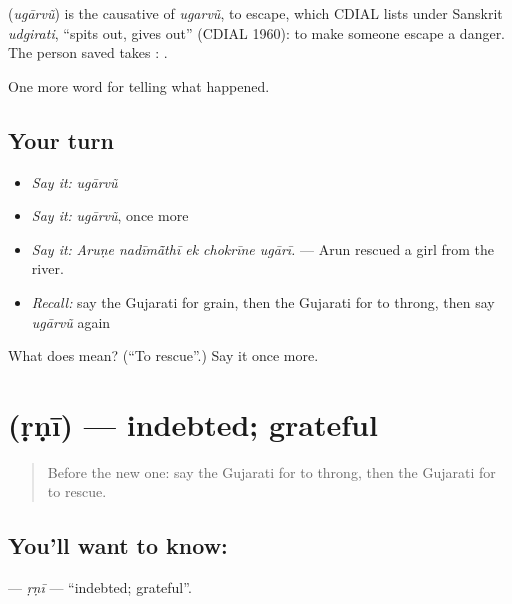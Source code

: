 \begin{cousinweb}
\textbf{} (\emph{ugārvũ}) is the causative of \emph{ugarvũ}, to escape, which CDIAL lists under Sanskrit \emph{udgirati}, \textquotedblleft{}spits out, gives out\textquotedblright{} (CDIAL 1960): to make someone escape a danger. The person saved takes \textbf{}: \textbf{ }.
\end{cousinweb}

\begin{grammarlens}[title={What you've built}]
One more word for telling what happened.
\end{grammarlens}

\subsection*{Your turn}
\begin{itemize}
\raggedright
  \item \emph{Say it:} \emph{ugārvũ}
  \item \emph{Say it:} \emph{ugārvũ}, once more
  \item \emph{Say it:} \emph{Aruṇe nadīmā̃thī ek chokrīne ugārī.} — Arun rescued a girl from the river.
  \item \emph{Recall:} say the Gujarati for grain, then the Gujarati for to throng, then say \emph{ugārvũ} again
\end{itemize}

\begin{tcolorbox}[breakable,colback=teal!4,colframe=teal!35!black,title={Before you move on}]
What does  mean? (\textquotedblleft{}To rescue\textquotedblright{}.) Say it once more.
\end{tcolorbox}
\section[\texorpdfstring{\gu{ઋણી} (ṛṇī)}{ઋણી (ṛṇī)}]{ (ṛṇī) — indebted; grateful}

\label{lesson:GU-C307-rni}



\begin{quote}
Before the new one: say the Gujarati for to throng, then the Gujarati for to rescue.
\end{quote}

\subsection*{You'll want to know: }
\textbf{} — \emph{ṛṇī} — \textquotedblleft{}indebted; grateful\textquotedblright{}.

